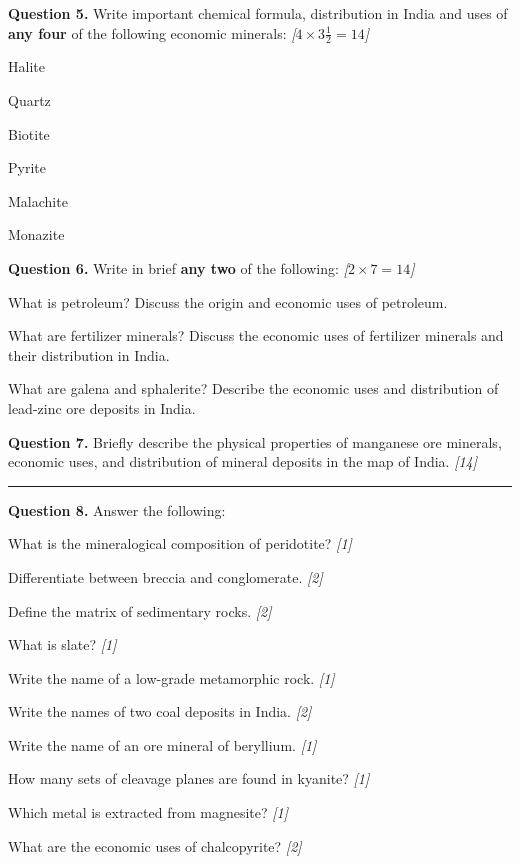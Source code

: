 \documentclass[11pt,a4paper]{article}
\newcommand{\pts}[1]{\hfill   \textit{[#1]}}
\begin{document}
\noindent   \textbf{Question 5.} Write important chemical formula, distribution in India and uses of   \textbf{any four} of the following economic minerals: \pts{$4  \times 3\frac{1}{2} = 14$}

\begin{parts}
  \item Halite
  \item Quartz
  \item Biotite
  \item Pyrite
  \item Malachite
  \item Monazite
\end{parts}

\medskip


\noindent   \textbf{Question 6.} Write in brief   \textbf{any two} of the following: \pts{$2  \times 7 = 14$}

\begin{parts}
  \item What is petroleum? Discuss the origin and economic uses of petroleum.
  \item What are fertilizer minerals? Discuss the economic uses of fertilizer minerals and their distribution in India.
  \item What are galena and sphalerite? Describe the economic uses and distribution of lead-zinc ore deposits in India.
\end{parts}

\medskip


\noindent   \textbf{Question 7.} Briefly describe the physical properties of manganese ore minerals, economic uses, and distribution of mineral deposits in the map of India. \pts{14}

\bigskip


\rule{\linewidth}{0.4pt}\smallskip




\noindent   \textbf{Question 8.} Answer the following:

\begin{parts}
  \item What is the mineralogical composition of peridotite? \pts{1}
  \item Differentiate between breccia and conglomerate. \pts{2}
  \item Define the matrix of sedimentary rocks. \pts{2}
  \item What is slate? \pts{1}
  \item Write the name of a low-grade metamorphic rock. \pts{1}
  \item Write the names of two coal deposits in India. \pts{2}
  \item Write the name of an ore mineral of beryllium. \pts{1}
  \item How many sets of cleavage planes are found in kyanite? \pts{1}
  \item Which metal is extracted from magnesite? \pts{1}
  \item What are the economic uses of chalcopyrite? \pts{2}
\end{parts}
\end{document}
